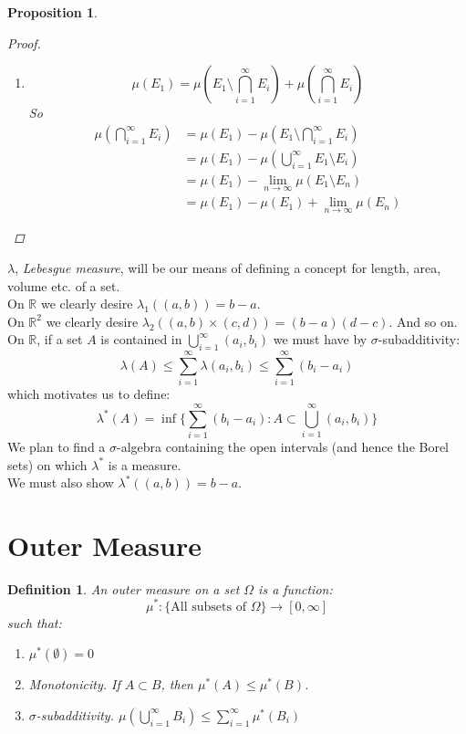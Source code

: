 \documentclass[12pt]{article}
\newtheorem{definition}{Definition}
\newtheorem{proposition}{Proposition}
\begin{document}
\begin{proposition}
\begin{proof}
\begin{enumerate}
\begin{align*}
				= \lim_{n \to \infty} \sum_{i=1}^n \mu(F_i) %
				&= \lim_{n \to \infty} \mu(\bigcup_{i=1}^n F_i) \\
				&= \lim_{n \to \infty} \mu(E_n)
			\end{align*}
			\item $$\mu(E_1) = \mu(E_1 \setminus \bigcap_{i=1}^\infty E_i) + \mu(\bigcap_{i=1}^\infty E_i)$$
			So
			\begin{align*}
				\mu(\bigcap_{i=1}^\infty E_i) &= \mu(E_1) - \mu(E_1 \setminus \bigcap_{i=1}^\infty E_i)\\
				&= \mu(E_1) - \mu(\bigcup_{i=1}^\infty E_1 \setminus E_i)\\
				&= \mu(E_1) - \lim_{n \to \infty} \mu(E_1 \setminus E_n)\\
				&= \mu(E_1) - \mu(E_1) + \lim_{n \to \infty} \mu(E_n)
			\end{align*}
		\end{enumerate}
	\end{proof}
\end{proposition}

$\lambda$, \emph{Lebesgue measure}, will be our means of defining a concept for length, area, volume etc. of a set. \\
On $\mathbb{R}$ we clearly desire $\lambda_1 ((a,b)) = b - a$.\\
On $\mathbb{R}^2$ we clearly desire $\lambda_2 ((a,b) \times (c,d)) = (b - a)(d - c)$.
And so on. \\[11pt]
On $\mathbb{R}$, if a set $A$ is contained in $\bigcup_{i=1}^\infty(a_i,b_i)$ we must have by $\sigma$-subadditivity:
$$\lambda(A) \le \sum_{i=1}^\infty \lambda(a_i,b_i) \le \sum_{i=1}^\infty (b_i - a_i)$$
which motivates us to define:
$$\lambda^*(A) = \inf\{\sum_{i=1}^\infty(b_i - a_i) : A \subset \bigcup_{i=1}^\infty(a_i,b_i)\}$$
We plan to find a $\sigma$-algebra containing the open intervals (and hence the Borel sets) on which $\lambda^*$ is a measure.\\
We must also show $\lambda^*((a,b)) = b - a$.


\section{Outer Measure}

\begin{definition} \label{D:OuterMeasure}
	An \emph{outer measure} on a set $\Omega$ is a function:
	$$\mu^* : \{\text{All subsets of $\Omega$}\} \to [0,\infty]$$
	such that:
	\begin{enumerate}
		\item $\mu^*(\emptyset) = 0$
		\item \emph{Monotonicity}. If $A \subset B$, then $\mu^*(A) \le \mu^*(B)$.
		\item \emph{$\sigma$-subadditivity}. $\mu(\bigcup_{i=1}^\infty B_i) \le \sum_{i=1}^\infty \mu^*(B_i)$
	\end{enumerate}
\end{definition}
\end{document}

